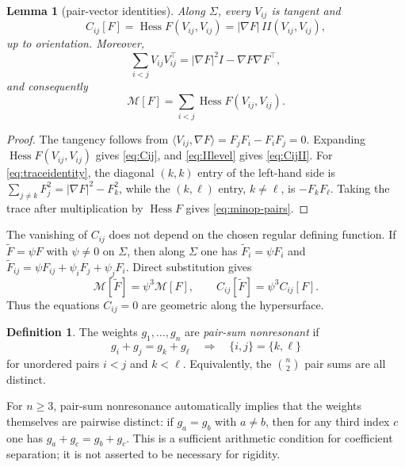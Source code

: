 \documentclass[preprint,12pt]{elsarticle}
\numberwithin{equation}{section}
\newtheorem{lemma}[theorem]{Lemma}
\theoremstyle{definition}\newtheorem{definition}[theorem]{Definition}
\theoremstyle{remark}\newtheorem{remark}[theorem]{Remark}
\begin{document}
\begin{lemma}[pair-vector identities]\label{lem:pairvectors}
Along $\Sigma$, every $V_{ij}$ is tangent and
\begin{equation}\label{eq:CijII}
C_{ij}[F]=\operatorname{Hess}F(V_{ij},V_{ij})=|\nabla F|\,II(V_{ij},V_{ij}),
\end{equation}
up to orientation. Moreover,
\begin{equation}\label{eq:traceidentity}
\sum_{i<j}V_{ij}V_{ij}^{\!\top}=|\nabla F|^2I-\nabla F\nabla F^{\!\top},
\end{equation}
and consequently
\begin{equation}\label{eq:minop-pairs}
\mathcal M[F]=\sum_{i<j}\operatorname{Hess}F(V_{ij},V_{ij}).
\end{equation}
\end{lemma}
\begin{proof}
The tangency follows from $\langle V_{ij},\nabla F\rangle=F_jF_i-F_iF_j=0$. Expanding $\operatorname{Hess}F(V_{ij},V_{ij})$ gives \eqref{eq:Cij}, and \eqref{eq:IIlevel} gives \eqref{eq:CijII}. For \eqref{eq:traceidentity}, the diagonal $(k,k)$ entry of the left-hand side is $\sum_{j\ne k}F_j^2=|\nabla F|^2-F_k^2$, while the $(k,\ell)$ entry, $k\ne\ell$, is $-F_kF_\ell$. Taking the trace after multiplication by $\operatorname{Hess}F$ gives \eqref{eq:minop-pairs}.
\end{proof}

The vanishing of $C_{ij}$ does not depend on the chosen regular defining function. If $\widetilde F=\psi F$ with $\psi\ne0$ on $\Sigma$, then along $\Sigma$ one has $\widetilde F_i=\psi F_i$ and $\widetilde F_{ij}=\psi F_{ij}+\psi_iF_j+\psi_jF_i$. Direct substitution gives
\begin{equation}\label{eq:gauge}
\mathcal M[\widetilde F]=\psi^3\mathcal M[F],\qquad C_{ij}[\widetilde F]=\psi^3C_{ij}[F].
\end{equation}
Thus the equations $C_{ij}=0$ are geometric along the hypersurface.

\begin{definition}\label{def:nonresonance}
The weights $g_1,\ldots,g_n$ are \emph{pair-sum nonresonant} if
\begin{equation}\label{eq:nonresonance}
g_i+g_j=g_k+g_\ell\quad\Longrightarrow\quad\{i,j\}=\{k,\ell\}
\end{equation}
for unordered pairs $i<j$ and $k<\ell$. Equivalently, the $\binom n2$ pair sums are all distinct.
\end{definition}
For $n\ge3$, pair-sum nonresonance automatically implies that the weights themselves are pairwise distinct: if $g_a=g_b$ with $a\ne b$, then for any third index $c$ one has $g_a+g_c=g_b+g_c$. This is a sufficient arithmetic condition for coefficient separation; it is not asserted to be necessary for rigidity.
\end{document}
